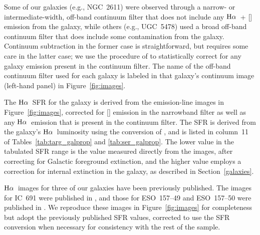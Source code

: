 \documentclass[twocolumn,twocolappendix,tighten,times]{aastex6}
\newcommand{\NII}{\ion{N}{2}}
\newcommand{\Ha}{\ensuremath{{\rm H}\alpha}}
\begin{document}
\clearpage
Some of our galaxies (e.g., NGC~2611) were observed through a narrow- or 
intermediate-width, off-band continuum filter that does not include any 
\Ha\ + [\NII] emission from the galaxy, while others (e.g., UGC~5478) used a 
broad off-band continuum filter that does include some contamination from the 
galaxy. Continuum subtraction in the former case is straightforward, but requires 
some care in the latter case; we use the procedure of \citet{kennicutt08} to 
statistically correct for any galaxy emission present in the continuum filter. 
The name of the off-band continuum filter used for each galaxy is labeled in 
that galaxy's continuum image (left-hand panel) in Figure~\ref{fig:images}.

The \Ha\ SFR for the galaxy is derived from the emission-line images in 
Figure~\ref{fig:images}, corrected for [\NII] emission in the narrowband 
filter as well as any \Ha\ emission that is present in the continuum filter. 
The SFR is derived from the galaxy's \Ha\ luminosity using the conversion of 
\citet{hunter10}, and is listed in column~11 of Tables~\ref{tab:targ_galprop} 
and \ref{tab:ser_galprop}. The lower value in the tabulated SFR range is the 
value measured directly from the images, after correcting for Galactic 
foreground extinction, and the higher value employs a correction for internal 
extinction in the galaxy, as described in Section~\ref{galaxies}.

\Ha\ images for three of our galaxies have been previously published. The 
images for IC~691 were published in \citet{keeney06}, and those for ESO~157--49
and ESO~157--50 were published in \citet{keeney13}. We reproduce these images 
in Figure~\ref{fig:images} for completeness but adopt the previously published 
SFR values, corrected to use the \citet{hunter10} SFR conversion when necessary
for consistency with the rest of the sample.

\bigskip

\end{document}
